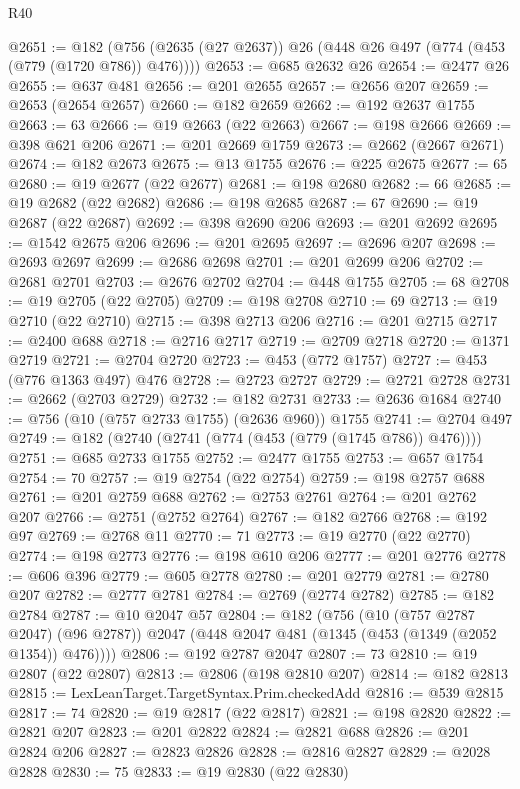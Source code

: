 \begin{lexlean}{R40}
\begin{coremodule}
@2651 := @182 (@756 (@2635 (@27 @2637)) @26 (@448 @26 @497 (@774 (@453 (@779 (@1720 @786)) @476))))
@2653 := @685 @2632 @26
@2654 := @2477 @26
@2655 := @637 @481
@2656 := @201 @2655
@2657 := @2656 @207
@2659 := @2653 (@2654 @2657)
@2660 := @182 @2659
@2662 := @192 @2637 @1755
@2663 := 63
@2666 := @19 @2663 (@22 @2663)
@2667 := @198 @2666
@2669 := @398 @621 @206
@2671 := @201 @2669 @1759
@2673 := @2662 (@2667 @2671)
@2674 := @182 @2673
@2675 := @13 @1755
@2676 := @225 @2675
@2677 := 65
@2680 := @19 @2677 (@22 @2677)
@2681 := @198 @2680
@2682 := 66
@2685 := @19 @2682 (@22 @2682)
@2686 := @198 @2685
@2687 := 67
@2690 := @19 @2687 (@22 @2687)
@2692 := @398 @2690 @206
@2693 := @201 @2692
@2695 := @1542 @2675 @206
@2696 := @201 @2695
@2697 := @2696 @207
@2698 := @2693 @2697
@2699 := @2686 @2698
@2701 := @201 @2699 @206
@2702 := @2681 @2701
@2703 := @2676 @2702
@2704 := @448 @1755
@2705 := 68
@2708 := @19 @2705 (@22 @2705)
@2709 := @198 @2708
@2710 := 69
@2713 := @19 @2710 (@22 @2710)
@2715 := @398 @2713 @206
@2716 := @201 @2715
@2717 := @2400 @688
@2718 := @2716 @2717
@2719 := @2709 @2718
@2720 := @1371 @2719
@2721 := @2704 @2720
@2723 := @453 (@772 @1757)
@2727 := @453 (@776 @1363 @497) @476
@2728 := @2723 @2727
@2729 := @2721 @2728
@2731 := @2662 (@2703 @2729)
@2732 := @182 @2731
@2733 := @2636 @1684
@2740 := @756 (@10 (@757 @2733 @1755) (@2636 @960)) @1755
@2741 := @2704 @497
@2749 := @182 (@2740 (@2741 (@774 (@453 (@779 (@1745 @786)) @476))))
@2751 := @685 @2733 @1755
@2752 := @2477 @1755
@2753 := @657 @1754
@2754 := 70
@2757 := @19 @2754 (@22 @2754)
@2759 := @198 @2757 @688
@2761 := @201 @2759 @688
@2762 := @2753 @2761
@2764 := @201 @2762 @207
@2766 := @2751 (@2752 @2764)
@2767 := @182 @2766
@2768 := @192 @97
@2769 := @2768 @11
@2770 := 71
@2773 := @19 @2770 (@22 @2770)
@2774 := @198 @2773
@2776 := @198 @610 @206
@2777 := @201 @2776
@2778 := @606 @396
@2779 := @605 @2778
@2780 := @201 @2779
@2781 := @2780 @207
@2782 := @2777 @2781
@2784 := @2769 (@2774 @2782)
@2785 := @182 @2784
@2787 := @10 @2047 @57
@2804 := @182
    (@756
      (@10 (@757 @2787 @2047) (@96 @2787))
      @2047
      (@448 @2047 @481 (@1345 (@453 (@1349 (@2052 @1354)) @476))))
@2806 := @192 @2787 @2047
@2807 := 73
@2810 := @19 @2807 (@22 @2807)
@2813 := @2806 (@198 @2810 @207)
@2814 := @182 @2813
@2815 := LexLeanTarget.TargetSyntax.Prim.checkedAdd
@2816 := @539 @2815
@2817 := 74
@2820 := @19 @2817 (@22 @2817)
@2821 := @198 @2820
@2822 := @2821 @207
@2823 := @201 @2822
@2824 := @2821 @688
@2826 := @201 @2824 @206
@2827 := @2823 @2826
@2828 := @2816 @2827
@2829 := @2028 @2828
@2830 := 75
@2833 := @19 @2830 (@22 @2830)

\end{coremodule}
\end{lexlean}
